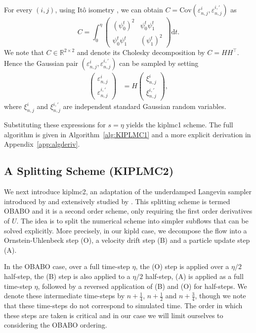 For every $(i,j)$, using It\^o isometry \citep{oksendal2013stochastic}, we can obtain $C = \mathrm{Cov}(\varepsilon_{n,j}^i, \varepsilon_{n,j}^{i,\prime})$ as
\begin{equation}\label{eq:covariancemat}
C =
\int_0^\eta
\begin{pmatrix}
(\psi_0^{t})^2 & \psi_0^t\psi_1^t\\
\psi_0^t\psi_1^t & (\psi_1^{t})^2
\end{pmatrix}
\mathrm{d}t.
\end{equation}
We note that $C\in\mathbb{R}^{2\times2}$ and denote its Cholesky decomposition by $C=H H^\top$. Hence the Gaussian pair $(\varepsilon_{n,j}^i, \varepsilon_{n,j}^{i,\prime})$ can be sampled by setting
\begin{align*}
\begin{pmatrix}\varepsilon_{n,j}^i\\
\varepsilon_{n,j}^{i,\prime}\end{pmatrix}
&= H
\begin{pmatrix}\xi_{n,j}^i\\
\xi_{n,j}^{i,\prime}\end{pmatrix},
\end{align*}
where $\xi_{n,j}^i$ and $\xi_{n,j}^{i,\prime}$ are independent standard Gaussian random variables.

Substituting these expressions for $s = \eta$ yields the \gls*{kiplmc1} scheme. The full algorithm is given in Algorithm~\ref{alg:KIPLMC1} and a more explicit derivation in Appendix~\ref{app:algderiv}.

\subsection{A Splitting Scheme (KIPLMC2)}

We next introduce \gls*{kiplmc2}, an adaptation of the underdamped Langevin sampler introduced by \citep{HOROWITZ1991247} and extensively studied by \citep{monmarche2021high}. This splitting scheme is termed OBABO and it is a second order scheme, only requiring the first order derivatives of $U$. The idea is to split the numerical scheme into simpler subflows that can be solved explicitly. More precisely, in our \gls*{kipld} case, we decompose the flow into a Ornstein-Uhlenbeck step (O), a velocity drift step (B) and a particle update step (A). 

In the OBABO case, over a full time-step $\eta$, the (O) step is applied over a $\eta/2$ half-step, the (B) step is also applied to a $\eta/2$ half-step, (A) is applied as a full time-step $\eta$, followed by a reversed application of (B) and (O) for half-steps. We denote these intermediate time-steps by $n+\frac{1}{4}$, $n+\frac{1}{2}$ and $n+\frac{3}{4}$, though we note that these time-steps do not correspond to simulated time. The order in which these steps are taken is critical \citep{monmarche2021high} and in our case we will limit ourselves to considering the OBABO ordering.

